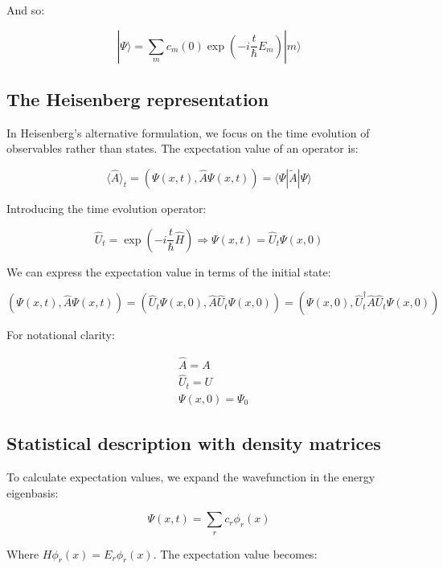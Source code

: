 \documentclass[italian]{HKNdocument}
\begin{document}
And so:

\begin{equation}
|\Psi\rangle=\sum_{m} c_{m}(0) \exp \left(-i \frac{t}{\hbar} E_{m}\right)|m\rangle
\end{equation}

\subsection{The Heisenberg representation}
In Heisenberg's alternative formulation, we focus on the time evolution of observables rather than states. The expectation value of an operator is:

\begin{equation}
\langle\hat{A}\rangle_{t}=(\Psi(x, t), \hat{A} \Psi(x, t))=\langle\Psi| \tilde{A}|\Psi\rangle
\end{equation}

Introducing the time evolution operator:

\begin{equation}
\hat{U}_{t}=\exp \left(-i \frac{t}{\hbar} \hat{H}\right) \Longrightarrow \Psi(x, t)=\hat{U}_{t} \Psi(x, 0)
\end{equation}

We can express the expectation value in terms of the initial state:

\begin{equation}
(\Psi(x, t), \hat{A} \Psi(x, t))=\left(\hat{U}_{t} \Psi(x, 0), \hat{A} \hat{U}_{t} \Psi(x, 0)\right)=\left(\Psi(x, 0), \hat{U}_{t}^{\dagger} \hat{A} \hat{U}_{t} \Psi(x, 0)\right)
\end{equation}

For notational clarity:

\begin{align}
& \hat{A}=A \\
& \hat{U}_{t}=U  \\
& \Psi(x, 0)=\Psi_{0}
\end{align}

\subsection{Statistical description with density matrices}
To calculate expectation values, we expand the wavefunction in the energy eigenbasis:

\begin{equation}
\Psi(x, t)=\sum_{r} c_{r} \phi_{r}(x)
\end{equation}

Where $H \phi_{r}(x)=E_{r} \phi_{r}(x)$. The expectation value becomes:
\end{document}
